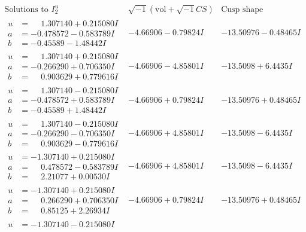 \documentclass[1p]{elsarticle_modified}
\theoremstyle{definition}
\newcommand{\I}{\sqrt{-1}}
\begin{document}
$$\begin{array}{c|c|c}  
\text{Solutions to }I^u_{2}& \I (\text{vol} + \sqrt{-1}CS) & \text{Cusp shape}\\
 \hline 
\begin{aligned}
u &= \phantom{-}1.307140 + 0.215080 I \\
a &= -0.478572 - 0.583789 I \\
b &= -0.45589 - 1.48442 I\end{aligned}
 & -4.66906 - 0.79824 I & -13.50976 - 0.48465 I \\ \hline\begin{aligned}
u &= \phantom{-}1.307140 + 0.215080 I \\
a &= -0.266290 + 0.706350 I \\
b &= \phantom{-}0.903629 + 0.779616 I\end{aligned}
 & -4.66906 - 4.85801 I & -13.5098 + 6.4435 I \\ \hline\begin{aligned}
u &= \phantom{-}1.307140 - 0.215080 I \\
a &= -0.478572 + 0.583789 I \\
b &= -0.45589 + 1.48442 I\end{aligned}
 & -4.66906 + 0.79824 I & -13.50976 + 0.48465 I \\ \hline\begin{aligned}
u &= \phantom{-}1.307140 - 0.215080 I \\
a &= -0.266290 - 0.706350 I \\
b &= \phantom{-}0.903629 - 0.779616 I\end{aligned}
 & -4.66906 + 4.85801 I & -13.5098 - 6.4435 I \\ \hline\begin{aligned}
u &= -1.307140 + 0.215080 I \\
a &= \phantom{-}0.478572 - 0.583789 I \\
b &= \phantom{-}2.21077 + 0.00530 I\end{aligned}
 & -4.66906 + 4.85801 I & -13.5098 - 6.4435 I \\ \hline\begin{aligned}
u &= -1.307140 + 0.215080 I \\
a &= \phantom{-}0.266290 + 0.706350 I \\
b &= \phantom{-}0.85125 + 2.26934 I\end{aligned}
 & -4.66906 + 0.79824 I & -13.50976 + 0.48465 I \\ \hline\begin{aligned}
u &= -1.307140 - 0.215080 I \\

\end{aligned}
\end{array}$$
\end{document}
